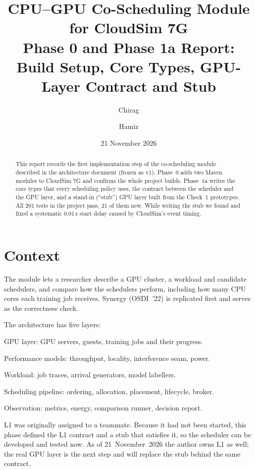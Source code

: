 \documentclass[11pt,a4paper]{article}
\title{CPU--GPU Co-Scheduling Module for CloudSim 7G\\[4pt]
\large Phase 0 and Phase 1a Report: Build Setup, Core Types, GPU-Layer Contract and Stub}
\author{Chirag \and Hamiz}
\date{21 November 2026}
\begin{document}
\maketitle

\begin{abstract}
This report records the first implementation step of the co-scheduling module described in the
architecture document (frozen as v1). Phase~0 adds two Maven modules to CloudSim 7G and confirms
the whole project builds. Phase~1a writes the core types that every scheduling policy uses, the
contract between the scheduler and the GPU layer, and a stand-in (``stub'') GPU layer built from
the Check~1 prototypes. All 201 tests in the project pass, 21 of them new. While writing the stub
we found and fixed a systematic 0.01\,s start delay caused by CloudSim's event timing.
\end{abstract}

\tableofcontents

\section{Context}

The module lets a researcher describe a GPU cluster, a workload and candidate schedulers, and
compare how the schedulers perform, including how many CPU cores each training job receives.
Synergy (OSDI~'22) is replicated first and serves as the correctness check.

The architecture has five layers:

\begin{description}[leftmargin=2.2cm,style=nextline]
  \item[L1] GPU layer: GPU servers, guests, training jobs and their progress.
  \item[L2] Performance models: throughput, locality, interference seam, power.
  \item[L3] Workload: job traces, arrival generators, model labellers.
  \item[L4] Scheduling pipeline: ordering, allocation, placement, lifecycle, broker.
  \item[L5] Observation: metrics, energy, comparison runner, decision report.
\end{description}

L1 was originally assigned to a teammate. Because it had not been started, this phase defined
the L1 contract and a stub that satisfies it, so the scheduler can be developed and tested now.
As of 21~November~2026 the author owns L1 as well; the real GPU layer is the next step and will
replace the stub behind the same contract.
\end{document}
